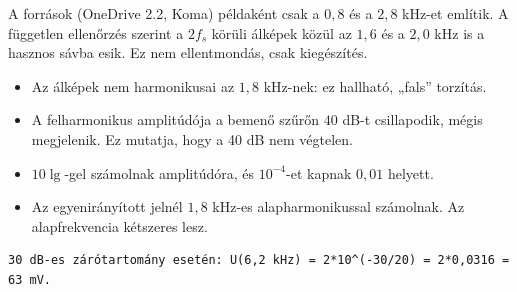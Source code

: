\begin{center}\end{center}
\begin{figyelem}[Javítás]
A források (OneDrive 2.2, Koma) példaként csak a $0{,}8$ és a $2{,}8$ kHz-et említik. A független ellenőrzés szerint a $2f_s$ körüli álképek közül az $1{,}6$ és a $2{,}0$ kHz is a hasznos sávba esik. Ez nem ellentmondás, csak kiegészítés.
\end{figyelem}
\begin{eredmeny}

\begin{center}\end{center}

\begin{center}\end{center}

\begin{center}\end{center}
\end{eredmeny}
\begin{tipp}[Ellenőrzés]
\begin{itemize}
\item Az álképek nem harmonikusai az $1{,}8$ kHz-nek: ez hallható, „fals” torzítás.
\item A felharmonikus amplitúdója a bemenő szűrőn $40$ dB-t csillapodik, mégis megjelenik. Ez mutatja, hogy a 40 dB nem végtelen.
\end{itemize}
\end{tipp}
\begin{figyelem}
\begin{itemize}
\item $10\lg$-gel számolnak amplitúdóra, és $10^{-4}$-et kapnak $0{,}01$ helyett.
\item Az egyenirányított jelnél $1{,}8$ kHz-es alapharmonikussal számolnak. Az alapfrekvencia kétszeres lesz.
\end{itemize}
\end{figyelem}
\begin{tipp}
\small
\begin{verbatim}
30 dB-es zárótartomány esetén: U(6,2 kHz) = 2*10^(-30/20) = 2*0,0316 = 63 mV.
\end{verbatim}
\end{tipp}
